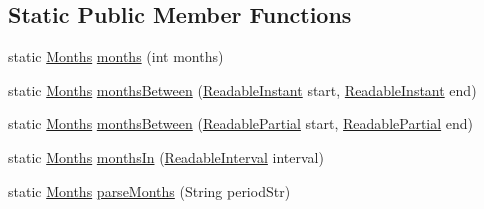 \subsection*{Static Public Member Functions}
\begin{DoxyCompactItemize}
\item 
static \hyperlink{classorg_1_1joda_1_1time_1_1_months}{Months} \hyperlink{classorg_1_1joda_1_1time_1_1_months_ab48e4eb193664a7bfdb722f0c2986652}{months} (int months)
\item 
static \hyperlink{classorg_1_1joda_1_1time_1_1_months}{Months} \hyperlink{classorg_1_1joda_1_1time_1_1_months_ac2e9383ac53bb677135f3d628d9c12f9}{months\-Between} (\hyperlink{interfaceorg_1_1joda_1_1time_1_1_readable_instant}{Readable\-Instant} start, \hyperlink{interfaceorg_1_1joda_1_1time_1_1_readable_instant}{Readable\-Instant} end)
\item 
static \hyperlink{classorg_1_1joda_1_1time_1_1_months}{Months} \hyperlink{classorg_1_1joda_1_1time_1_1_months_a0592da139d225467f2c0a318817b5b82}{months\-Between} (\hyperlink{interfaceorg_1_1joda_1_1time_1_1_readable_partial}{Readable\-Partial} start, \hyperlink{interfaceorg_1_1joda_1_1time_1_1_readable_partial}{Readable\-Partial} end)
\item 
static \hyperlink{classorg_1_1joda_1_1time_1_1_months}{Months} \hyperlink{classorg_1_1joda_1_1time_1_1_months_ad0a8b95372af476baeabd5cb0c20db46}{months\-In} (\hyperlink{interfaceorg_1_1joda_1_1time_1_1_readable_interval}{Readable\-Interval} interval)
\item 
static \hyperlink{classorg_1_1joda_1_1time_1_1_months}{Months} \hyperlink{classorg_1_1joda_1_1time_1_1_months_abf230efa984af796529784be32268663}{parse\-Months} (String period\-Str)
\end{DoxyCompactItemize}
